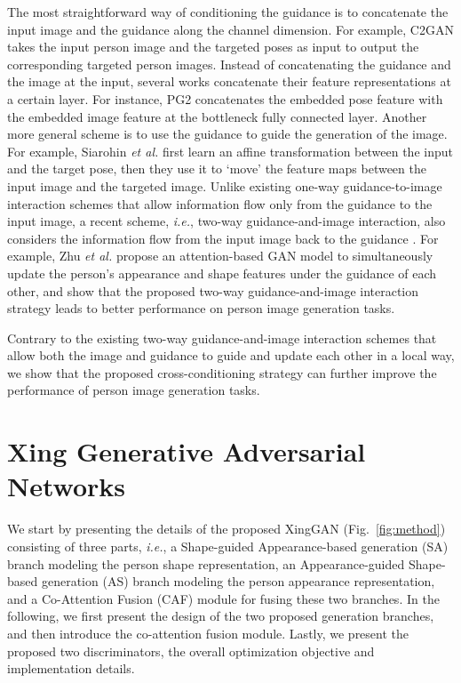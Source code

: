 \documentclass[runningheads]{llncs}
\begin{document}
The most straightforward way of conditioning the guidance is to concatenate the input image and the guidance along the channel dimension.
For example, C2GAN \cite{tang2019cycle} takes the input person image and the targeted poses as input to output the corresponding targeted person images.
Instead of concatenating the guidance and the image at the input, several works \cite{ma2017pose,ma2018disentangled,esser2018variational} concatenate their feature representations at a certain layer.
For instance, PG2 \cite{ma2017pose} concatenates the embedded pose feature with the embedded image feature at the bottleneck fully connected layer. 
Another more general scheme is to use the guidance to guide the generation of the image.
For example, Siarohin \emph{et al.} \cite{siarohin2018deformable} first learn an affine transformation between the input and the target pose, then they use it to `move' the feature maps between the input image and the targeted image.
Unlike existing one-way guidance-to-image interaction schemes that allow information flow only from the guidance to the input image, a recent scheme, \emph{i.e.}, two-way guidance-and-image interaction, also considers the information flow from the input image back to the guidance \cite{zhu2019progressive,albahar2019guided}.
For example, Zhu \emph{et al.} \cite{zhu2019progressive} propose an attention-based GAN model to simultaneously update the person's appearance and shape features under the guidance of each other, and show that the proposed two-way guidance-and-image interaction strategy leads to better performance on person image generation tasks.

Contrary to the existing two-way guidance-and-image interaction schemes \cite{zhu2019progressive,albahar2019guided} that allow both the image and guidance to guide and update each other in a local way, we show that the proposed cross-conditioning strategy can further improve the performance of person image generation tasks. \section{Xing Generative Adversarial Networks}
We start by presenting the details of the proposed XingGAN (Fig.~\ref{fig:method}) consisting of three parts, \emph{i.e.}, a Shape-guided Appearance-based generation (SA) branch modeling the person shape representation, an Appearance-guided Shape-based generation (AS) branch modeling the person appearance representation, and a Co-Attention Fusion (CAF) module for fusing these two branches. 
In the following, we first present the design of the two proposed generation branches, and then introduce the co-attention fusion module.
Lastly, we present the proposed two discriminators, the overall optimization objective and implementation details.
\end{document}
